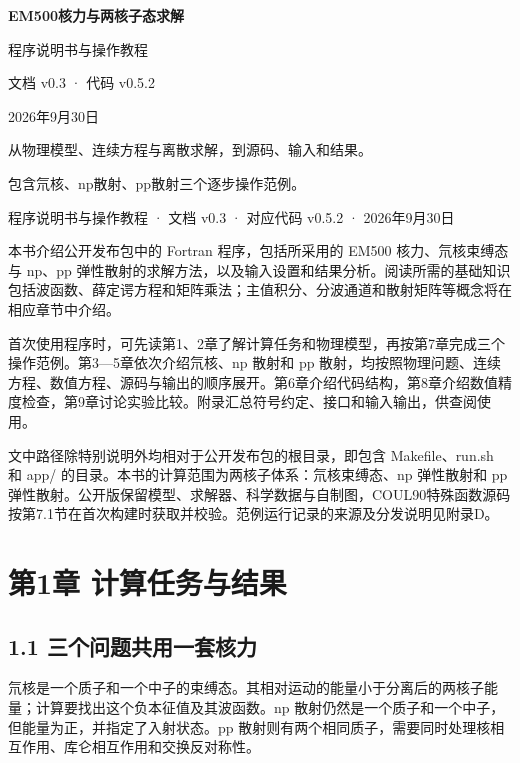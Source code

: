 \documentclass[UTF8,a4paper,zihao=5,fontset=fandol]{ctexart}
\begin{document}
    \begin{titlepage}\centering\vspace*{28mm}
{\Huge\bfseries EM500核力与两核子态求解\par}\vspace{12mm}
{\Large 程序说明书与操作教程\par}\vspace{8mm}
{\large 文档 v0.3 · 代码 v0.5.2\par}\vspace{8mm}
2026年9月30日\vfill
\begin{minipage}{.86\textwidth}\large
从物理模型、连续方程与离散求解，到源码、输入和结果。\par\medskip
包含氘核、np散射、pp散射三个逐步操作范例。\end{minipage}\vspace*{20mm}\end{titlepage}
\tableofcontents\clearpage
程序说明书与操作教程 · 文档 v0.3 · 对应代码 v0.5.2 · 2026年9月30日

本书介绍公开发布包中的 Fortran 程序，包括所采用的 EM500 核力、氘核束缚态与 np、pp 弹性散射的求解方法，以及输入设置和结果分析。阅读所需的基础知识包括波函数、薛定谔方程和矩阵乘法；主值积分、分波通道和散射矩阵等概念将在相应章节中介绍。

首次使用程序时，可先读第1、2章了解计算任务和物理模型，再按第7章完成三个操作范例。第3—5章依次介绍氘核、np 散射和 pp 散射，均按照物理问题、连续方程、数值方程、源码与输出的顺序展开。第6章介绍代码结构，第8章介绍数值精度检查，第9章讨论实验比较。附录汇总符号约定、接口和输入输出，供查阅使用。

文中路径除特别说明外均相对于公开发布包的根目录，即包含 {\ttfamily\small Makefile}、{\ttfamily\small run.\allowbreak{}sh} 和 {\ttfamily\small app/\allowbreak{}} 的目录。本书的计算范围为两核子体系：氘核束缚态、np 弹性散射和 pp 弹性散射。公开版保留模型、求解器、科学数据与自制图，COUL90特殊函数源码按第7.1节在首次构建时获取并校验。范例运行记录的来源及分发说明见附录D。

\clearpage\section*{第1章 计算任务与结果}
\subsection*{1.1 三个问题共用一套核力}
氘核是一个质子和一个中子的束缚态。其相对运动的能量小于分离后的两核子能量；计算要找出这个负本征值及其波函数。np 散射仍然是一个质子和一个中子，但能量为正，并指定了入射状态。pp 散射则有两个相同质子，需要同时处理核相互作用、库仑相互作用和交换反对称性。
\end{document}
